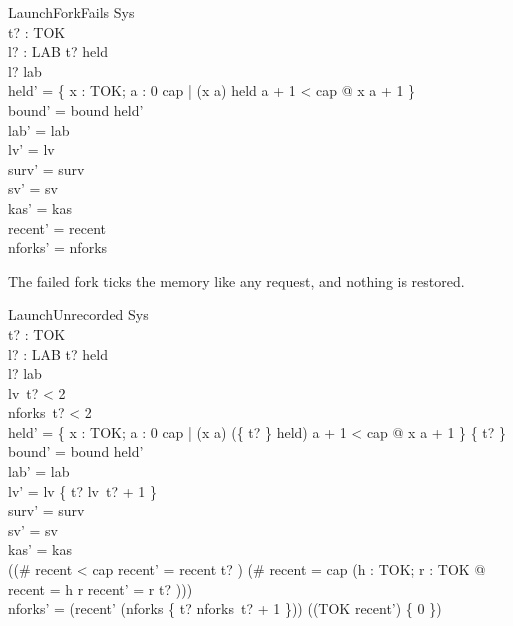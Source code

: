 \documentclass[a4paper,10pt,fleqn]{article}
\begin{document}
\begin{schema}{LaunchForkFails}
  \Delta Sys \\
  t? : TOK \\ l? : LAB
\where
  t? \notin \dom held \\
  l? \notin \dom lab \\
  held' = \{ x : TOK; a : 0 \upto cap | (x \mapsto a) \in held \land a + 1 < cap @ x \mapsto a + 1 \} \\
  bound' = bound \cap \dom held' \\
  lab' = lab \\
  lv' = lv \\
  surv' = surv \\
  sv' = sv \\
  kas' = kas \\
  recent' = recent \\
  nforks' = nforks
\end{schema}

The failed fork ticks the memory like any request, and nothing is restored.

\begin{schema}{LaunchUnrecorded}
  \Delta Sys \\
  t? : TOK \\ l? : LAB
\where
  t? \notin \dom held \\
  l? \notin \dom lab \\
  lv~t? < 2 \\
  nforks~t? < 2 \\
  held' = \{ x : TOK; a : 0 \upto cap | (x \mapsto a) \in (\{ t? \} \ndres held) \land a + 1 < cap @ x \mapsto a + 1 \} \cup \{ t?  \} \\
  bound' = bound \cap \dom held' \\
  lab' = lab \\
  lv' = lv \oplus \{ t? \mapsto lv~t? + 1 \} \\
  surv' = surv \\
  sv' = sv \\
  kas' = kas \\
  ((\# recent < cap \land recent' = recent \cat \langle t? \rangle) \lor (\# recent = cap \land (\exists h : TOK; r : \seq TOK @ recent = \langle h \rangle \cat r \land recent' = r \cat \langle t? \rangle))) \\
  nforks' = (\ran recent' \dres (nforks \oplus \{ t? \mapsto nforks~t? + 1 \})) \cup ((TOK \setminus \ran recent') \cross \{ 0 \})
\end{schema}
\end{document}
